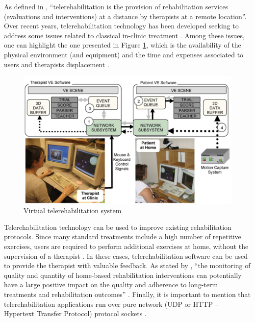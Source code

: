 As defined in \cite{deutsch2007}, ``telerehabilitation is the provision of rehabilitation services (evaluations and interventions) at a distance by therapists at a remote location''. Over recent years, telerehabilitation technology has been developed seeking to address some issues related to classical in-clinic treatment \cite{pani2014,postolache2011}. Among these issues, one can highlight the one presented in Figure \ref{fig:holden2007}, which is the availability of the physical environment (and equipment) and the time and expenses associated to users and therapists displacement \cite{brennan2011,holden2007,dhurjaty2004}.

\begin{figure}[!hbt]
\begin{center}
\includegraphics[width=1 \textwidth]{img/cap2/holden2007}
\caption{Virtual telerehabilitation system \cite{holden2007}}
\label{fig:holden2007}
\end{center}
\end{figure}

Telerehabilitation technology can be used to improve existing rehabilitation protocols. Since many standard treatments include a high number of repetitive exercises, users are required to perform additional exercises at home, without the supervision of a therapist \cite{ortiz2014}. In these cases, telerehabilitation software can be used to provide the therapist with valuable feedback. As stated by \cite{ortiz2014}, ``the monitoring of quality and quantity of home-based rehabilitation interventions can potentially have a large positive impact on the quality and adherence to long-term treatments and rehabilitation outcomes'' \cite{pons2014}. Finally, it is important to mention that telerehabilitation applications run over pure network (UDP or HTTP -- Hypertext Transfer Protocol) protocol sockets \cite{leung2007}.

